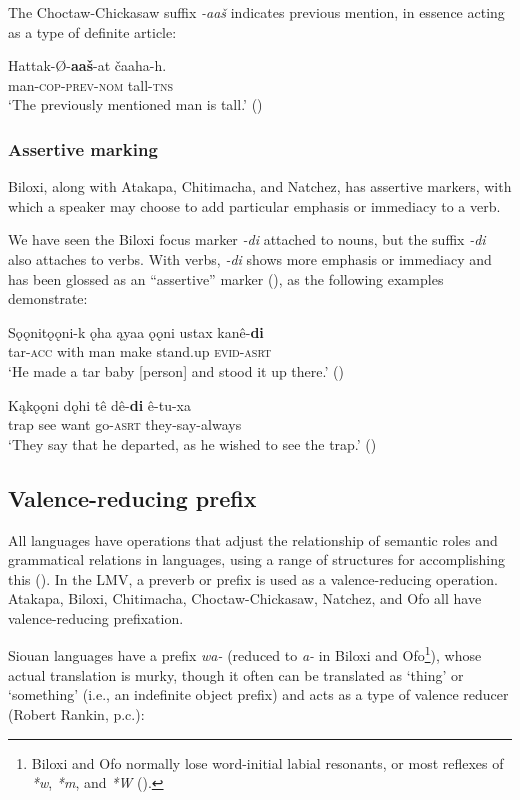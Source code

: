 \documentclass[output=paper]{LSP/langsci}
\begin{document}
	The Choctaw-Chickasaw suffix \emph{-aaš} indicates previous mention, in essence acting as a type of definite article:

\ea
\gll	Hattak-Ø-\textbf{aaš}-at čaaha-h.\\
	man-\textsc{cop-prev-nom} tall-\textsc{tns} \\
\glt `The previously mentioned man is tall.' 
(\citealt[89]{Broadwell2006})
\z

\subsubsection{Assertive marking}

Biloxi, along with Atakapa, Chitimacha, and Natchez, has assertive markers, with which a speaker may choose to add particular emphasis or immediacy to a verb. 

	We have seen the Biloxi focus marker \emph{-di} attached to nouns, but the suffix \emph{-di} also attaches to verbs. With verbs, \emph{-di} shows more emphasis or immediacy and has been glossed as an “assertive” marker (\citealt[3]{Kaufman2011}), as the following examples demonstrate:

\ea
\gll	Sǫǫnitǫǫni-k ǫha ąyaa ǫǫni ustax kanê-\textbf{di} \\
	tar-\textsc{acc}  with man make stand.up \textsc{evid-asrt}\\
\glt `He made a tar baby [person] and stood it up there.' (\citealt[13]{DorseySwanton1912})
\z

\ea
\gll	Kąkǫǫni dǫhi tê dê-\textbf{di} ê-tu-xa\\
	trap 	 see want go-\textsc{asrt} they-say-always\\
\glt `They say that he departed, as he wished to see the trap.' (\citealt[184]{DorseySwanton1912})
\z

\subsection{Valence-reducing prefix}

All languages have operations that adjust the relationship of semantic roles and grammatical relations in languages, using a range of structures for accomplishing this (\citealt[169]{Payne1997}). In the LMV, a preverb or prefix is used as a valence-reducing operation. Atakapa, Biloxi, Chitimacha, Choctaw-Chickasaw, Natchez, and Ofo all have valence-reducing prefixation. 	

	Siouan languages have a prefix \emph{wa-} (reduced to \emph{a-} in Biloxi and Ofo\footnote{Biloxi and Ofo normally lose word-initial labial resonants, or most reflexes of \emph{*w}, \emph{*m}, and \emph{*W} (\citealt[19]{Rankin2002}).}), whose actual translation is murky, though it often can be translated as `thing' or `something' (i.e., an indefinite object prefix) and acts as a type of valence reducer (Robert Rankin, p.c.):
\end{document}

